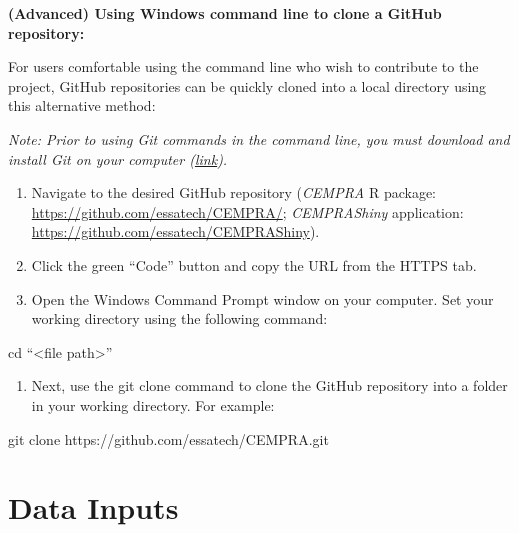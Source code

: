 \documentclass[
  letterpaper,
  DIV=11,
  numbers=noendperiod]{scrreprt}
\newenvironment{Shaded}{\begin{snugshade}}{\end{snugshade}}
\newcommand{\BuiltInTok}[1]{\textcolor[rgb]{0.00,0.23,0.31}{#1}}
\newcommand{\FunctionTok}[1]{\textcolor[rgb]{0.28,0.35,0.67}{#1}}
\newcommand{\NormalTok}[1]{\textcolor[rgb]{0.00,0.23,0.31}{#1}}
\newcommand{\OperatorTok}[1]{\textcolor[rgb]{0.37,0.37,0.37}{#1}}
\providecommand{\tightlist}{%
  \setlength{\itemsep}{0pt}\setlength{\parskip}{0pt}}
\begin{document}
\textbf{(Advanced) Using Windows command line to clone a GitHub
repository:}

For users comfortable using the command line who wish to contribute to
the project, GitHub repositories can be quickly cloned into a local
directory using this alternative method:

\emph{Note: Prior to using Git commands in the command line, you must
download and install Git on your computer
(\href{https://github.com/git-guides/install-git}{link}).}

\begin{enumerate}
\def\labelenumi{\arabic{enumi}.}
\item
  Navigate to the desired GitHub repository (\emph{CEMPRA} R package:
  \url{https://github.com/essatech/CEMPRA/}; \emph{CEMPRAShiny}
  application: \url{https://github.com/essatech/CEMPRAShiny}).
\item
  Click the green ``Code'' button and copy the URL from the HTTPS tab.
\item
  Open the Windows Command Prompt window on your computer. Set your
  working directory using the following command:
\end{enumerate}

\begin{Shaded}
\begin{Highlighting}[]
\BuiltInTok{cd}\NormalTok{ “}\OperatorTok{\textless{}}\NormalTok{file path}\OperatorTok{\textgreater{}}\NormalTok{”}
\end{Highlighting}
\end{Shaded}

\begin{enumerate}
\def\labelenumi{\arabic{enumi}.}
\setcounter{enumi}{3}
\tightlist
\item
  Next, use the git clone command to clone the GitHub repository into a
  folder in your working directory. For example:
\end{enumerate}

\begin{Shaded}
\begin{Highlighting}[]
\FunctionTok{git}\NormalTok{ clone https://github.com/essatech/CEMPRA.git}
\end{Highlighting}
\end{Shaded}


\chapter{Data Inputs}\label{data-inputs}
\end{document}

